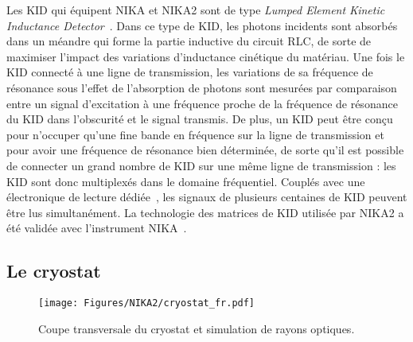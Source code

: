 Les KID qui équipent NIKA et NIKA2 sont
de type \emph{Lumped Element Kinetic Inductance
  Detector}~\citep{Doyle2008_LEKID,Roesch2012_LEKID}. Dans
ce type de KID, les photons incidents sont absorbés dans un méandre
qui forme la partie inductive du circuit RLC, de sorte de maximiser
l'impact des variations d'inductance cinétique du matériau.   
Une fois le KID connecté à une ligne de transmission, les variations
de sa fréquence de résonance sous l'effet de l'absorption de photons
sont mesurées par comparaison entre un signal d'excitation à
une fréquence proche de la fréquence de résonance du KID dans
l'obscurité et le signal transmis. 
De plus, un KID peut être conçu
pour n'occuper qu'une fine bande en fréquence sur la ligne de
transmission et pour avoir une fréquence de résonance bien déterminée,
de sorte qu'il est possible de connecter un grand nombre de KID sur
une même ligne de transmission : les KID sont donc multiplexés dans le
domaine fréquentiel. Couplés avec une électronique de lecture
dédiée~\citep{Bourrion2016}, les signaux de plusieurs centaines de KID
peuvent être lus simultanément. 
La technologie des matrices de KID utilisée par NIKA2 a été validée
avec l'instrument
NIKA~\citep{Monfardini2010_NIKA, Monfardini2011_NIKA, Roesch2012_LEKID, Calvo2013}.



\subsection{Le cryostat}
   
\begin{figure}[ht!] 
\begin{center}
\texttt{[image: Figures/NIKA2/cryostat\_fr.pdf]}
\caption[Coupe transversale du cryostat]{Coupe transversale du
  cryostat et simulation de rayons optiques.} 
 \label{fig:cryostat}
\end{center}
\end{figure}

